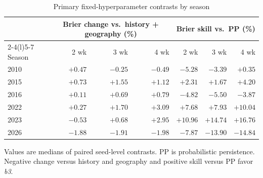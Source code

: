 \documentclass[10pt]{article}
\newcommand{\bthree}{\textit{b3}}
\begin{document}
\begin{table}[!h]
\centering
\caption{Primary fixed-hyperparameter contrasts by season}
\small
\begin{tabular}{@{}lrrrrrr@{}}
\toprule
 & \multicolumn{3}{c}{Brier change vs.\ history + geography (\%)} & \multicolumn{3}{c}{Brier skill vs.\ PP (\%)}\\
\cmidrule(lr){2-4}\cmidrule(l){5-7}
Season & 2 wk & 3 wk & 4 wk & 2 wk & 3 wk & 4 wk\\
\midrule
2010 & $+0.47$ & $-0.25$ & $-0.49$ & $-5.28$ & $-3.39$ & $+0.35$\\
2015 & $+0.73$ & $+1.55$ & $+1.12$ & $+2.31$ & $+1.67$ & $+4.20$\\
2016 & $+0.11$ & $+0.69$ & $+0.79$ & $-4.82$ & $-5.50$ & $-3.87$\\
2022 & $+0.27$ & $+1.70$ & $+3.09$ & $+7.68$ & $+7.93$ & $+10.04$\\
2023 & $-0.53$ & $+0.68$ & $+2.95$ & $+10.96$ & $+14.74$ & $+16.76$\\
2026 & $-1.88$ & $-1.91$ & $-1.98$ & $-7.87$ & $-13.90$ & $-14.84$\\
\bottomrule
\end{tabular}

\vspace{2pt}\parbox{0.92\textwidth}{\footnotesize Values are medians of paired seed-level contrasts. PP is probabilistic persistence. Negative change versus history and geography and positive skill versus PP favor \bthree{}.}
\end{table}
\end{document}
